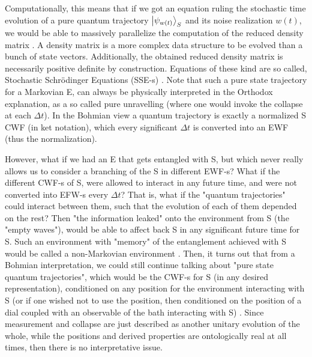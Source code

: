 \documentclass[11pt, a4paper]{article} %
\begin{document}
Computationally, this means that if we got an equation ruling the stochastic time evolution of a pure quantum trajectory $\ket{\psi_{w(t)}}_S$ and its noise realization $w(t)$, we would be able to massively parallelize the computation of the reduced density matrix \cite{MarkovianityDefs, QuantumTrajs}. A density matrix is a more complex data structure to be evolved than a bunch of state vectors. Additionally, the obtained reduced density matrix is necessarily positive definite by construction. Equations of these kind are so called, Stochastic Schrödinger Equations (SSE-s) \cite{Generalized, continousMeas}. Note that such a pure state trajectory for a Markovian E, can always be physically interpreted in the Orthodox explanation, as a so called pure unravelling \cite{MarkovianityDefs} (where one would invoke the collapse at each $\Delta t$). In the Bohmian view a quantum trajectory is exactly a normalized S CWF (in ket notation), which every significant $\Delta t$ is converted into an EWF (thus the normalization).


However, what if we had an E that gets entangled with S, but which never really allows us to consider a branching of the S in different EWF-s? What if the different CWF-s of S, were allowed to interact in any future time, and were not converted into EFW-s every $\Delta t$? That is, what if the "quantum trajectories" could interact between them, such that the evolution of each of them depended on the rest? Then "the information leaked" onto the environment from S (the "empty waves"), would be able to affect back S in any significant future time for S. Such an environment with "memory" of the entanglement achieved with S would be called a non-Markovian environment \cite{MarkovianityDefs}. Then, it turns out that from a Bohmian interpretation, we could still continue talking about "pure state quantum trajectories", which would be the CWF-s for S (in any desired representation), conditioned on any position for the environment interacting with S (or if one wished not to use the position, then conditioned on the position of a dial coupled with an observable of the bath interacting with S) \cite{NMisModal, interpretSSE}. Since measurement and collapse are just described as another unitary evolution of the whole, while the positions and derived properties are ontologically real at all times, then there is no interpretative issue.
\end{document}
